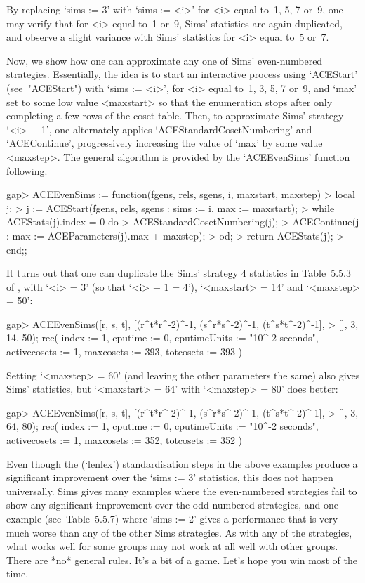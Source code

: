 By replacing `sims := 3' with `sims := <i>' for <i> equal to~1,  5,  7
or~9, one may verify that for <i> equal to~1  or~9,  Sims'  statistics
are again  duplicated,  and  observe  a  slight  variance  with  Sims'
statistics for <i> equal to~5 or~7.

Now, we show how one can approximate any one of  Sims'  even-numbered
strategies. Essentially, the idea is to start  an  interactive  {\ACE}
process using `ACEStart' (see~"ACEStart") with `sims := <i>', for  <i>
equal to~1, 3, 5, 7 or~9, and `max' set to some low  value  <maxstart>
so that the enumeration stops after only completing a few rows of  the
coset table. Then, to  approximate  Sims'  strategy  `<i>  +  1',  one
alternately  applies  `ACEStandardCosetNumbering'  and  `ACEContinue',
progressively increasing the value of `max' by some  value  <maxstep>.
The general  algorithm  is  provided  by  the  `ACEEvenSims'  function
following.

\beginexample
gap> ACEEvenSims := function(fgens, rels, sgens, i, maxstart, maxstep) 
>      local j;
>      j := ACEStart(fgens, rels, sgens : sims := i, max := maxstart);
>      while ACEStats(j).index = 0 do
>        ACEStandardCosetNumbering(j);
>        ACEContinue(j : max := ACEParameters(j).max + maxstep);
>      od;
>      return ACEStats(j);
>    end;;
\endexample

It turns out that one can duplicate the Sims' strategy 4 statistics in
Table~5.5.3 of \cite{Sim94}, with `<i> = 3' (so that `<i> + 1  =  4'),
`<maxstart> = 14' and `<maxstep> = 50':

\beginexample
gap> ACEEvenSims([r, s, t], [(r^t*r^-2)^-1, (s^r*s^-2)^-1, (t^s*t^-2)^-1],
>                [], 3, 14, 50);
rec( index := 1, cputime := 0, cputimeUnits := "10^-2 seconds", 
  activecosets := 1, maxcosets := 393, totcosets := 393 )
\endexample

Setting `<maxstep> = 60' (and leaving the other parameters  the  same)
also gives Sims' statistics, but `<maxstart> = 64' with  `<maxstep>  =
80' does better:

\beginexample
gap> ACEEvenSims([r, s, t], [(r^t*r^-2)^-1, (s^r*s^-2)^-1, (t^s*t^-2)^-1],
>                [], 3, 64, 80);
rec( index := 1, cputime := 0, cputimeUnits := "10^-2 seconds", 
  activecosets := 1, maxcosets := 352, totcosets := 352 )
\endexample

Even though the (`lenlex') standardisation steps in the above examples
produce a significant improvement over the  `sims  :=  3'  statistics,
this  does  not  happen  universally.  Sims  \cite{Sim94}  gives  many
examples  where  the  even-numbered  strategies  fail  to   show   any
significant improvement over  the  odd-numbered  strategies,  and  one
example (see~Table~5.5.7) where `sims := 2' gives a  performance  that
is very much worse than any of the other Sims strategies. As with  any
of the strategies, what works well for some groups may not work at all
well with other groups. There are *no* general rules. It's a bit of  a
game. Let's hope you win most of the time.

